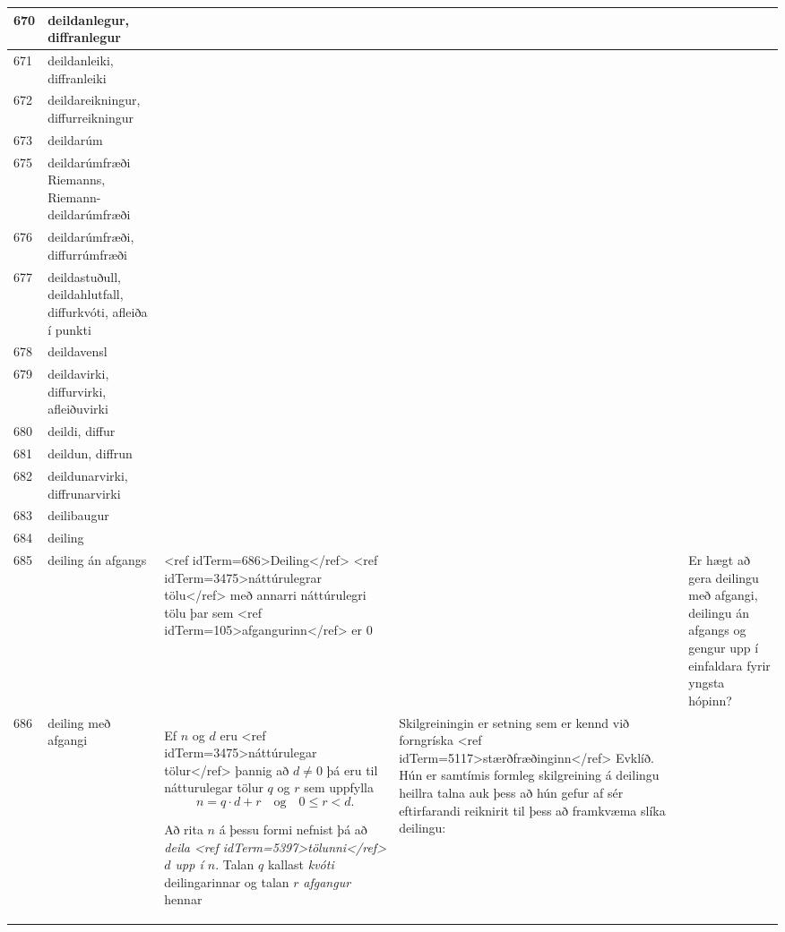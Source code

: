 \begin{longtable}{p{}|p{}|p{}|p{}|p{}}
\hline
670 & deildanlegur, diffranlegur &  &  &  \\
\hline
671 & deildanleiki, diffranleiki &  &  &  \\
\hline
672 & deildareikningur, diffurreikningur &  &  &  \\
\hline
673 & deildarúm &  &  &  \\
\hline
675 & deildarúmfræði Riemanns, Riemann-deildarúmfræði &  &  &  \\
\hline
676 & deildarúmfræði, diffurrúmfræði &  &  &  \\
\hline
677 & deildastuðull, deildahlutfall, diffurkvóti, afleiða í punkti &  &  &  \\
\hline
678 & deildavensl &  &  &  \\
\hline
679 & deildavirki, diffurvirki, afleiðuvirki &  &  &  \\
\hline
680 & deildi, diffur &  &  &  \\
\hline
681 & deildun, diffrun &  &  &  \\
\hline
682 & deildunarvirki, diffrunarvirki &  &  &  \\
\hline
683 & deilibaugur &  &  &  \\
\hline
684 & deiling &  &  &  \\
\hline
685 & deiling án afgangs & <ref idTerm=686>Deiling</ref> <ref idTerm=3475>náttúrulegrar tölu</ref> með annarri náttúrulegri tölu þar sem <ref idTerm=105>afgangurinn</ref> er 0 &  & Er hægt að gera deilingu með afgangi, deilingu án afgangs og gengur upp í einfaldara fyrir yngsta hópinn? \\
\hline
686 & deiling með afgangi & Ef $n$ og $d$ eru <ref idTerm=3475>náttúrulegar tölur</ref> þannig að $d \neq 0$ þá eru til nátturulegar tölur $q$ og $r$ sem uppfylla \[n = q \cdot d + r \quad \text{og} \quad 0 \leq r < d. \]

Að rita $n$ á þessu formi nefnist þá að \textit{deila <ref idTerm=5397>tölunni</ref> $d$ upp í $n$}. Talan $q$ kallast \textit{kvóti} deilingarinnar og talan
$r$ \textit{afgangur} hennar & Skilgreiningin er setning sem er kennd við forngríska <ref idTerm=5117>stærðfræðinginn</ref> Evklíð. Hún er samtímis formleg skilgreining á deilingu heillra talna auk þess að hún gefur af sér eftirfarandi reiknirit til þess að framkvæma slíka deilingu: 


\end{longtable}
